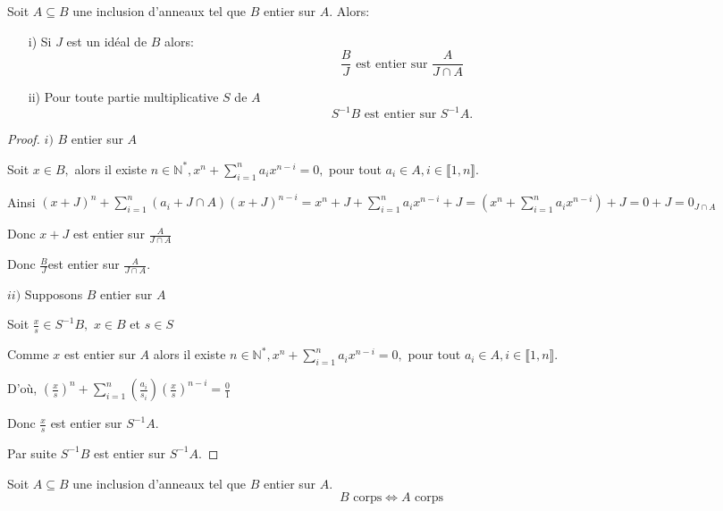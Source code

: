 \begin{maproposition}
	Soit $A \subseteq B$ une inclusion d'anneaux tel que $B$ entier sur $A$. Alors:\\
	\begin{enumerate}
		\item[i)] Si $J$ est un idéal de $B$ alors:
		\[ \dfrac{B}{J} \text{ est entier sur } \dfrac{A}{J \cap A}\]
		\item[ii)] Pour toute partie multiplicative $S$ de $A$
		\[ S^{-1}B \text{ est entier sur } S^{-1}A.\]
	\end{enumerate}
\end{maproposition}

\begin{proof}
	$i)$ $B$ entier sur $A$ 
	
	Soit $x\in B,$ alors il existe $n\in \mathbb{N}^{\ast },x^{n}+\sum\limits_{i=1}^{n}a_{i}x^{n-i}=0,$ pour tout $a_{i}\in
	A,i\in \llbracket 1, n \rrbracket.$
	
	Ainsi $(x+J)^{n}+\sum\limits_{i=1}^{n}(a_{i}+J\cap
	A)(x+J)^{n-i}=x^{n}+J+\sum\limits_{i=1}^{n}a_{i}x^{n-i}+J=(x^{n}+\sum%
	\limits_{i=1}^{n}a_{i}x^{n-i})+J=0+J=0_{J\cap A}$
	
	Donc $x+J$ est entier sur $\frac{A}{J\cap A}$
	
	Donc $\frac{B}{J}$est entier sur $\frac{A}{J\cap A}.$
	
	
	
	$ii)$ Supposons $B$ entier sur $A$
	
	Soit $\frac{x}{s}\in S^{-1}B,$ $x\in B$ et $s\in S$
	
	Comme $x$ est entier sur $A$ alors il existe $n\in \mathbb{N}^{\ast },x^{n}+\sum\limits_{i=1}^{n}a_{i}x^{n-i}=0,$ pour tout $a_{i}\in
	A,i\in \llbracket 1, n \rrbracket.$
	
	D'où, $(\frac{x}{s})^{n}+\sum\limits_{i=1}^{n}(\frac{a_{i}}{s_{i}})(%
	\frac{x}{s})^{n-i}=\frac{0}{1}$
	
	Donc $\frac{x}{s}$ est entier sur $S^{-1}A.$
	
	Par suite $S^{-1}B$ est entier sur $S^{-1}A.$
\end{proof}
\begin{maproposition}
	Soit $A \subseteq B$ une inclusion d'anneaux tel que $B$ entier sur $A$.
	\[ B \text{ corps} \Longleftrightarrow  A \text{ corps} \]
\end{maproposition}
